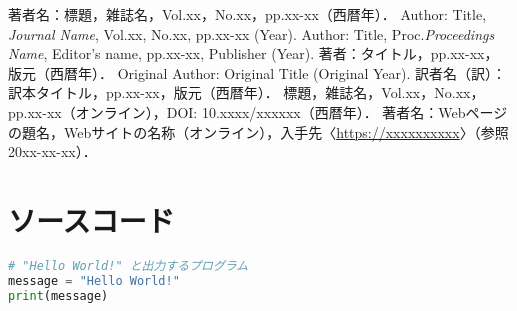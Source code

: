 \documentclass[dvipdfmx]{jsarticle} %
\theoremstyle{definition} %
\begin{document}
\begin{thebibliography}{99} %
   著者名：標題，雑誌名，Vol.xx，No.xx，pp.xx-xx（西暦年）．
   Author: Title, \textit{Journal Name}, Vol.xx, No.xx, pp.xx-xx (Year). %
   Author: Title, Proc.\textit{Proceedings Name}, Editor's name, pp.xx-xx, Publisher (Year).
   著者：タイトル，pp.xx-xx，版元（西暦年）．
   Original Author: Original Title (Original Year). 訳者名（訳）：訳本タイトル，pp.xx-xx，版元（西暦年）．
   標題，雑誌名，Vol.xx，No.xx，pp.xx-xx（オンライン），DOI: 10.xxxx/xxxxxx（西暦年）． %
   著者名：Webページの題名，Webサイトの名称（オンライン），入手先〈\url{https://xxxxxxxxxx}〉（参照20xx-xx-xx）．
\end{thebibliography}

\appendix %

\section{ソースコード}

\lstset{
  frame=single, %
  numbers=left, %
  breaklines = true %
}

\begin{lstlisting}[language=Python,caption=hello\_world.py,label=code:hello_world]
# "Hello World!" と出力するプログラム
message = "Hello World!"
print(message)
\end{lstlisting}

\end{document}
